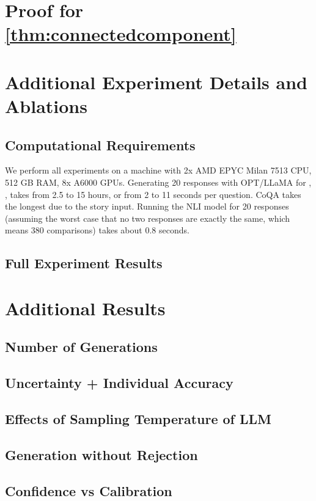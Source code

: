 \appendix
\newpage

\section{Proof for \cref{thm:connectedcomponent}}


\section{Additional Experiment Details and Ablations}



\subsection{Computational Requirements}
We perform all experiments on a machine with 2x AMD EPYC Milan 7513 CPU, 512 GB RAM, 8x A6000 GPUs. 
Generating 20 responses with OPT/LLaMA for \datasetcoqa, \datasetnqopen, \datasettrivia takes from 2.5 to 15 hours, or from 2 to 11 seconds per question. 
CoQA takes the longest due to the story input.
Running the NLI model for 20 responses (assuming the worst case that no two responses are exactly the same, which means 380 comparisons) takes about 0.8 seconds. 


\subsection{Full Experiment Results}\label{appendix:fullresults}





\section{Additional Results}

\subsection{Number of Generations}\label{appendix:numgen}


\subsection{Uncertainty + Individual Accuracy}


\subsection{Effects of Sampling Temperature of LLM}



\subsection{Generation without Rejection}




\subsection{Confidence vs Calibration}\label{appendix:calib}



